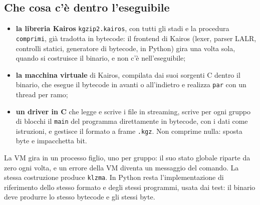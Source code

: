 \documentclass[11pt,a4paper]{article}
\newcommand{\kw}[1]{\texttt{#1}}
\begin{document}
\subsection{Che cosa c'è dentro l'eseguibile}

\begin{itemize}
\item \textbf{la libreria Kairos} \kw{kgzip2.kairos}, con tutti gli stadi e la procedura \kw{comprimi}, già tradotta in bytecode: il frontend di Kairos (lexer, parser LALR, controlli statici, generatore di bytecode, in Python) gira una volta sola, quando si costruisce il binario, e non c'è nell'eseguibile;
\item \textbf{la macchina virtuale} di Kairos, compilata dai suoi sorgenti C dentro il binario, che esegue il bytecode in avanti o all'indietro e realizza \kw{par} con un thread per ramo;
\item \textbf{un driver in C} che legge e scrive i file in streaming, scrive per ogni gruppo di blocchi il \kw{main} del programma direttamente in bytecode, con i dati come istruzioni, e gestisce il formato a frame \kw{.kgz}. Non comprime nulla: sposta byte e impacchetta bit.
\end{itemize}

\noindent La VM gira in un processo figlio, uno per gruppo: il suo stato globale riparte da zero ogni volta, e un errore della VM diventa un messaggio del comando. La stessa costruzione produce \kw{klzma}. In Python resta l'implementazione di riferimento dello stesso formato e degli stessi programmi, usata dai test: il binario deve produrre lo stesso bytecode e gli stessi byte.
\end{document}
